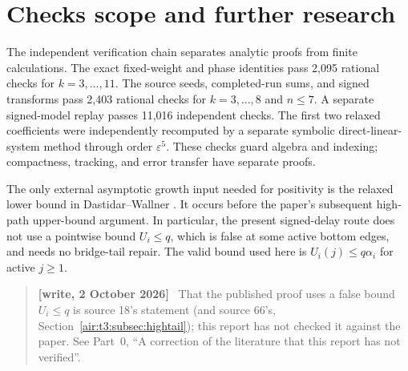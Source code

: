 \documentclass[11pt,letterpaper]{article}
\numberwithin{equation}{section}
\theoremstyle{remark}
\newcommand{\eps}{\varepsilon}
\newenvironment{writenote}{\par\smallskip\begin{quote}\small\textbf{[write, 2 October 2026]}\ }{\end{quote}\smallskip}
\begin{document}
\section{Checks scope and further research}\label{air:ka:sec:checks}
The independent verification chain separates analytic proofs from finite calculations. The exact fixed-weight and phase identities pass 2,095 rational checks for $k=3,\ldots,11$. The source seeds, completed-run sums, and signed transforms pass 2,403 rational checks for $k=3,\ldots,8$ and $n\le7$. A separate signed-model replay passes 11,016 independent checks. The first two relaxed coefficients were independently recomputed by a separate symbolic direct-linear-system method through order $\eps^5$. These checks guard algebra and indexing; compactness, tracking, and error transfer have separate proofs.

The only external asymptotic growth input needed for positivity is the relaxed lower bound in Dastidar--Wallner \cite[Section~3.4, equation~(9)]{gdw}. It occurs before the paper's subsequent high-path upper-bound argument. In particular, the present signed-delay route does not use a pointwise bound $U_i\le q$, which is false at some active bottom edges, and needs no bridge-tail repair. The valid bound used here is $U_i(j)\le q\alpha_i$ for active $j\ge1$.
\begin{writenote}
That the published proof uses a false bound $U_i\le q$ is source 18's statement (and source 66's, Section~\ref{air:t3:subsec:hightail}); this report has not checked it against the paper. See Part~0, ``A correction of the literature that this report has not verified''.
\end{writenote}
\end{document}
